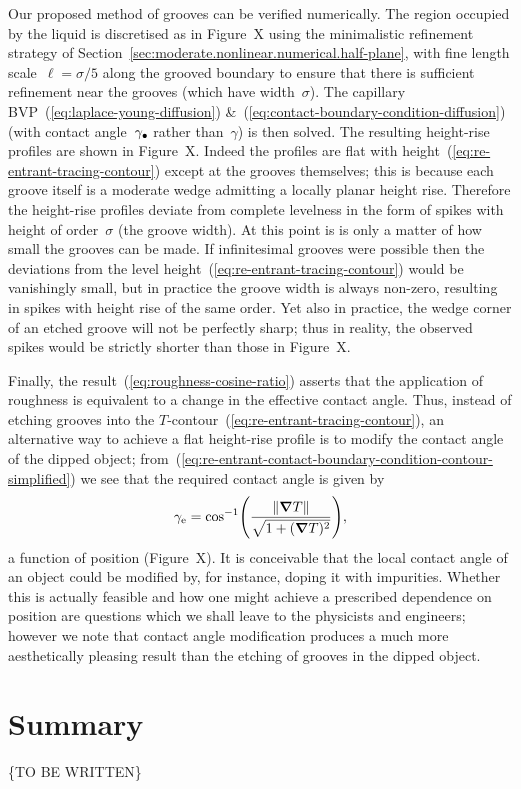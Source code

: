 Our proposed method of grooves can be verified numerically.
The region occupied by the liquid is discretised
as in Figure~X %
using the minimalistic refinement strategy
of Section~\ref{sec:moderate.nonlinear.numerical.half-plane},
with fine length scale~$\ell = \sigma / 5$ %
along the grooved boundary
to ensure that there is sufficient refinement near the grooves
(which have width~$\sigma$).
The capillary BVP~(\ref{eq:laplace-young-diffusion})
\&~(\ref{eq:contact-boundary-condition-diffusion})
(with contact angle~$\gamma_\bullet$ rather than~$\gamma$)
is then solved.
The resulting height-rise profiles are shown
in Figure~X. %
Indeed the profiles are flat with height~(\ref{eq:re-entrant-tracing-contour})
except at the grooves themselves;
this is because each groove itself is a moderate wedge
admitting a locally planar height rise.
Therefore the height-rise profiles deviate from complete levelness
in the form of spikes with height of order~$\sigma$ (the groove width).
At this point is is only a matter of how small the grooves can be made.
If infinitesimal grooves were possible
then the deviations from the level height~(\ref{eq:re-entrant-tracing-contour})
would be vanishingly small,
but in practice the groove width is always non-zero,
resulting in spikes with height rise of the same order.
Yet also in practice,
the wedge corner of an etched groove will not be perfectly sharp;
thus in reality, the observed spikes would be strictly shorter
than those in Figure~X. %

Finally, the result~(\ref{eq:roughness-cosine-ratio})
asserts that the application of roughness
is equivalent to a change in the effective contact angle.
Thus, instead of etching grooves
into the $T$-contour~(\ref{eq:re-entrant-tracing-contour}),
an alternative way to achieve a flat height-rise profile
is to modify the contact angle of the dipped object;
from~(\ref{eq:re-entrant-contact-boundary-condition-contour-simplified})
we see that the required contact angle is given by
\begin{equation}
  \gamma_\eff =
    \cos^{-1} \roundbr*{\frac{\norm{\del T}}{\sqrt{1 + (\del T)^2}}},
  \label{eq:contact-angle-required}
\end{equation}
a function of position
(Figure~X). %
It is conceivable that
the local contact angle of an object could be modified
by, for instance, doping it with impurities.
Whether this is actually feasible
and how one might achieve a prescribed dependence on position
are questions which we shall leave to the physicists and engineers;
however we note that contact angle modification
produces a much more aesthetically pleasing result
than the etching of grooves in the dipped object.

\section{Summary}
\label{sec:re-entrant.summary}

\{TO BE WRITTEN\}
